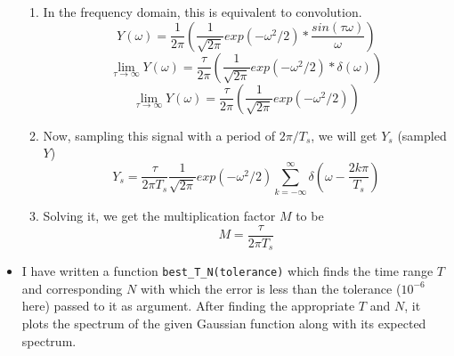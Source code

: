 \documentclass[11pt, a4paper]{article}
\begin{document}
\begin{itemize}
\begin{enumerate}
                \item In the frequency domain, this is equivalent to convolution.
                    \begin{equation*}
                    Y(\omega) = \frac{1}{2\pi}(\frac{1}{\sqrt{2\pi}} exp(-\omega^2/2)*\frac{sin(\tau \omega)}{\omega})
                    \end{equation*}
                    \begin{equation*}
                    \lim_{\tau \to \infty} Y(\omega) = \frac{\tau}{2\pi}(\frac{1}{\sqrt{2\pi}} exp(-\omega^2/2)*\delta(\omega))
                    \end{equation*}
                    \begin{equation*}
                    \lim_{\tau \to \infty} Y(\omega) =  \frac{\tau}{2\pi}(\frac{1}{\sqrt{2\pi}} exp(-\omega^2/2))                       
                    \end{equation*}
                \item Now, sampling this signal with a period of $2\pi/T_s$, we will get $Y_s$ (sampled $Y$)
                    \begin{equation*}
                    Y_{s} = \frac{\tau}{2\pi T_s}\frac{1}{\sqrt{2\pi}} exp(-\omega^2/2) \sum_{k = -\infty}^{\infty}\delta(\omega - \frac{2k\pi}{T_s})
                    \end{equation*}
                \item Solving it, we get the multiplication factor $M$ to be
                    \begin{equation}
                    M = \frac{\tau}{2\pi T_s}    
                    \end{equation}
            \end{enumerate}
        \item I have written a function \texttt{best\_T\_N(tolerance)} which finds the time range $T$ and corresponding $N$ with which the error is less than the tolerance ($10^{-6}$ here) passed to it as argument. After finding the appropriate $T$ and $N$, it plots the spectrum of the given Gaussian function along with its expected spectrum.
    \end{itemize}
\end{document}
